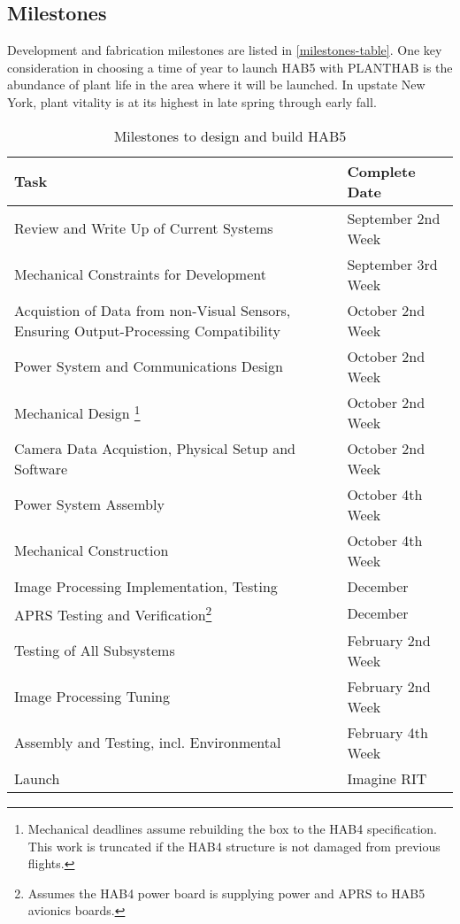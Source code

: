 \documentclass[conference]{IEEEtran} %
\begin{document}
\subsection{Milestones}
Development and fabrication milestones are listed in \autoref{milestones-table}.
One key consideration in choosing a time of year to launch HAB5 with PLANTHAB is the abundance of plant life in the area where it will be launched.
In upstate New York, plant vitality is at its highest in late spring through early fall.

\begin{table}[!ht]
  \centering
  \caption{Milestones to design and build HAB5}

\begin{minipage}{.45\textwidth}
  \noindent
  \begin{tabular}{@{}ll@{}}

  \label{milestones-table}
    \textbf{Task} & \textbf{Complete Date} \\
    \midrule
    Review and Write Up of Current Systems & September 2nd Week \\
    Mechanical Constraints for Development & September 3rd Week \\
    Acquistion of Data from non-Visual Sensors, Ensuring Output-Processing Compatibility & October 2nd Week \\
    Power System and Communications Design & October 2nd Week \\
    Mechanical Design \footnote{Mechanical deadlines assume rebuilding the box to the HAB4 specification. This work is truncated if the HAB4 structure is not damaged from previous flights.} & October 2nd Week \\
    Camera Data Acquistion, Physical Setup and Software & October 2nd Week \\
    Power System Assembly & October 4th Week \\
    Mechanical Construction & October 4th Week \\
    Image Processing Implementation, Testing & December \\
    APRS Testing and Verification\footnote{Assumes the HAB4 power board is supplying power and APRS to HAB5 avionics boards.} & December \\
    Testing of All Subsystems & February 2nd Week \\
    Image Processing Tuning & February 2nd Week \\
    Assembly and Testing, incl. Environmental & February 4th Week \\
    Launch & Imagine RIT \\
  \end{tabular}
\end{minipage}
\end{table}
\end{document}
